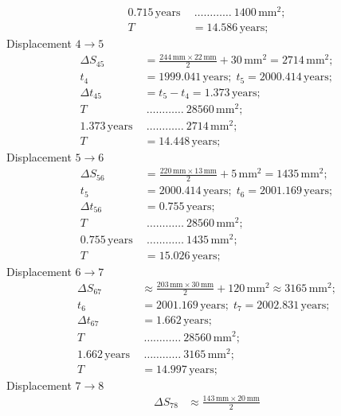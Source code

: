 \begin{description}
\begin{align*}
    0.715\,\mathrm{years}\ &\ \dots\dots\dots\dots\ 1400\,\mathrm{mm}^2;\\
    T &= 14.586\,\mathrm{years};
  \end{align*}
  Displacement $4 \rightarrow 5$
  \begin{align*}
    \Delta S_{45} &= \frac{244\,\mathrm{mm}\times22\,\mathrm{mm}}{2}
      + 30\,\mathrm{mm}^2 = 2714\,\mathrm{mm}^2;\\
    t_4 &= 1999.041\,\mathrm{years};\; t_5 = 2000.414\,\mathrm{years};\\
    \Delta t_{45} &= t_5 - t_4 = 1.373\,\mathrm{years};\\
    T\ &\ \dots\dots\dots\dots\ 28560\,\mathrm{mm}^2;\\
    1.373\,\mathrm{years}\ &\ \dots\dots\dots\dots\ 2714\,\mathrm{mm}^2;\\
    T &= 14.448\,\mathrm{years};
  \end{align*}
  Displacement $5 \rightarrow 6$
  \begin{align*}
    \Delta S_{56} &= \frac{220\,\mathrm{mm}\times13\,\mathrm{mm}}{2}
      + 5\,\mathrm{mm}^2 = 1435\,\mathrm{mm}^2;\\
    t_5 &= 2000.414\,\mathrm{years};\; t_6 = 2001.169\,\mathrm{years};\\
    \Delta t_{56} &= 0.755\,\mathrm{years};\\
    T\ &\ \dots\dots\dots\dots\ 28560\,\mathrm{mm}^2;\\
    0.755\,\mathrm{years}\ &\ \dots\dots\dots\dots\ 1435\,\mathrm{mm}^2;\\
    T &= 15.026\,\mathrm{years};
  \end{align*}
  Displacement $6 \rightarrow 7$
  \begin{align*}
    \Delta S_{67} &\approx \frac{203\,\mathrm{mm}\times30\,\mathrm{mm}}{2}
      + 120\,\mathrm{mm}^2 \approx 3165\,\mathrm{mm}^2;\\
    t_6 &= 2001.169\,\mathrm{years};\; t_7 = 2002.831\,\mathrm{years};\\
    \Delta t_{67} &= 1.662\,\mathrm{years};\\
    T\ &\ \dots\dots\dots\dots\ 28560\,\mathrm{mm}^2;\\
    1.662\,\mathrm{years}\ &\ \dots\dots\dots\dots\ 3165\,\mathrm{mm}^2;\\
    T &= 14.997\,\mathrm{years};
  \end{align*}
  Displacement $7 \rightarrow 8$
  \begin{align*}
    \Delta S_{78} &\approx \frac{143\,\mathrm{mm}\times20\,\mathrm{mm}}{2}

\end{align*}
\end{description}
